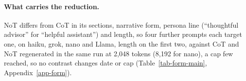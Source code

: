 \paragraph{What carries the reduction.}
NoT differs from CoT in its sections, narrative form, persona line (``thoughtful
advisor'' for ``helpful assistant'') and length, so four further prompts each
target one, on haiku, grok, nano and Llama, length on the first two, against
CoT and NoT regenerated in the same run at 2,048 tokens (8,192 for nano), a
cap few reached, so no contrast changes date or cap
(Table~\ref{tab-form-main}, Appendix~\ref{app-form}).
